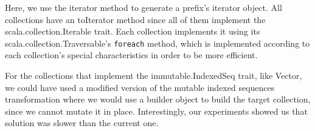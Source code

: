 Here, we use the iterator method to generate a prefix's iterator object. All
collections have an toIterator method since all of them implement the
scala.collection.Iterable trait. Each collection implements it using its
scala.collection.Traversable's \texttt{foreach} method, which is implemented according to
each collection's special characteristics in order to be more efficient.

For the collections that implement the immutable.IndexedSeq trait, like Vector,
we could have used a modified version of the mutable indexed sequences
transformation where we would use a builder object to build the target
collection, since we cannot mutate it in place. Interestingly, our experiments
showed us that solution was slower than the current one.